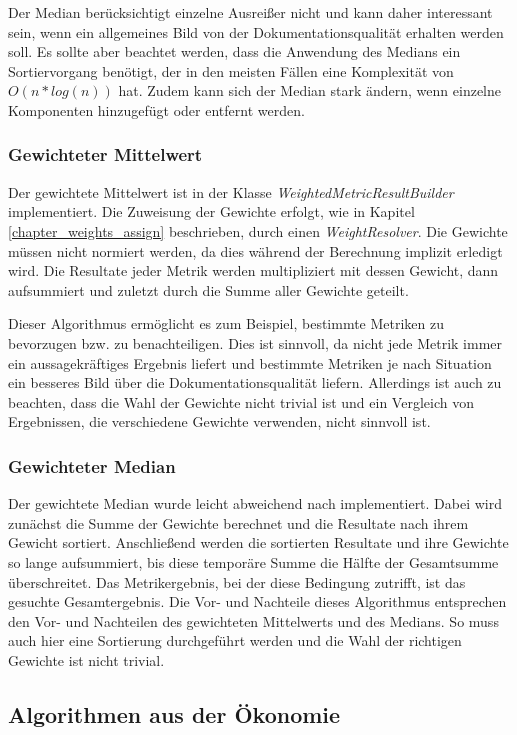 Der Median berücksichtigt einzelne Ausreißer nicht und kann daher interessant sein, wenn ein allgemeines Bild von der Dokumentationsqualität erhalten werden soll. Es sollte aber beachtet werden, dass die Anwendung des Medians ein Sortiervorgang benötigt, der in den meisten Fällen eine Komplexität von $O(n*log(n))$ hat.  Zudem kann sich der Median stark ändern, wenn einzelne Komponenten hinzugefügt oder entfernt werden.


\subsubsection{Gewichteter Mittelwert}\label{chapter:weighted_aggreg}
Der gewichtete Mittelwert ist in der Klasse \textit{WeightedMetricResultBuilder} implementiert. Die Zuweisung der Gewichte erfolgt, wie in Kapitel \ref{chapter_weights_assign} beschrieben, durch einen \textit{WeightResolver}. Die Gewichte müssen nicht normiert werden, da dies während der Berechnung implizit erledigt wird. Die Resultate jeder Metrik werden multipliziert mit dessen Gewicht, dann aufsummiert und zuletzt durch die Summe aller Gewichte geteilt. 


Dieser Algorithmus ermöglicht es zum Beispiel, bestimmte Metriken zu bevorzugen bzw. zu benachteiligen. Dies ist sinnvoll, da nicht jede Metrik immer ein aussagekräftiges Ergebnis liefert und bestimmte Metriken je nach Situation ein besseres Bild über die Dokumentationsqualität liefern. Allerdings ist auch zu beachten, dass die Wahl der Gewichte nicht trivial ist und ein Vergleich von Ergebnissen, die verschiedene Gewichte verwenden, nicht sinnvoll ist.

\subsubsection{Gewichteter Median}
Der gewichtete Median wurde leicht abweichend nach \cite[S.~37]{YAGER199835} implementiert. Dabei wird zunächst die Summe der Gewichte berechnet und die Resultate nach ihrem Gewicht sortiert. Anschließend werden die sortierten Resultate und ihre Gewichte so lange aufsummiert, bis diese temporäre Summe die Hälfte der Gesamtsumme überschreitet. Das Metrikergebnis, bei der diese Bedingung zutrifft, ist das gesuchte Gesamtergebnis. Die Vor- und Nachteile dieses Algorithmus entsprechen den Vor- und Nachteilen des gewichteten Mittelwerts und des Medians. So muss auch hier eine Sortierung durchgeführt werden und die Wahl der richtigen Gewichte ist nicht trivial. 

 \subsection{Algorithmen aus der Ökonomie}
 
